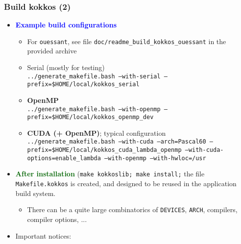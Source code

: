 \begin{frame}
  \frametitle{Build kokkos (2)}

  \begin{itemize}
  \item \textcolor{blue}{\textbf{Example build configurations}}
    \begin{itemize}
    \item For \texttt{ouessant}, see file \texttt{doc/readme\_build\_kokkos\_ouessant} in the provided archive
    \item Serial (mostly for testing)\\
      \texttt{../generate\_makefile.bash --with-serial --prefix=\$HOME/local/kokkos\_serial}
    \item \textbf{OpenMP}\\
      \texttt{../generate\_makefile.bash --with-openmp --prefix=\$HOME/local/kokkos\_openmp\_dev}
    \item \textbf{CUDA (+ OpenMP)}; typical configuration\\
      \texttt{../generate\_makefile.bash --with-cuda --arch=Pascal60 --prefix=\$HOME/local/kokkos\_cuda\_lambda\_openmp --with-cuda-options=enable\_lambda --with-openmp --with-hwloc=/usr}
    \end{itemize}
  \item \textcolor{darkgreen}{\textbf{After installation}} (\texttt{make kokkoslib; make install;} the file \texttt{Makefile.kokkos} is created, and designed to be reused in the application build system.
    \begin{itemize}
    \item There can be a quite large combinatorics of \texttt{DEVICES}, \texttt{ARCH}, compilers, compiler options, ...
    \end{itemize}
  \item Important notices:
  \end{itemize}
  
\end{frame}

